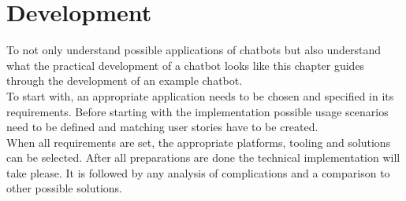 \chapter{Development}


To not only understand possible applications of chatbots but also understand what the practical development of a chatbot looks like this chapter guides through the development of an example chatbot.
\\

To start with, an appropriate application needs to be chosen and specified in its requirements.
Before starting with the implementation possible usage scenarios need to be defined and matching user stories have to be created.
\\
When all requirements are set, the appropriate platforms, tooling and solutions can be selected.
After all preparations are done the technical implementation will take please.
It is followed by any analysis of complications and a comparison to other possible solutions.
